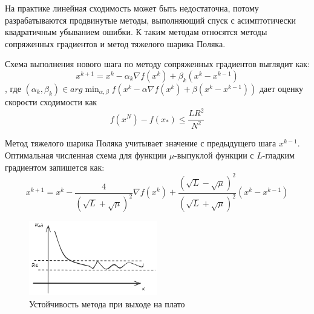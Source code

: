 На практике линейная сходимость может быть недостаточна, потому разрабатываются продвинутые методы, выполняющий спуск с
асимптотически квадратичным убыванием ошибки. К таким методам относятся методы сопряженных градиентов и 
метод тяжелого шарика Поляка.

Схема выполнения нового шага по методу сопряженных градиентов выглядит как:
\begin{equation}
    x^{k+1} = x^k - \alpha_k \nabla f(x^k) + \beta_k (x^k -x^{k-1})
\end{equation}
, где $(\alpha_k,\beta_k) \in arg \min_{\alpha,\beta} f(x^k - \alpha \nabla f(x^k) + \beta (x^k -x^{k-1}))$
дает оценку скорости сходимости как 
\begin{equation}
    f(x^N) -f(x_*) \le \frac{L R^2}{N^2}
\end{equation}

Метод тяжелого шарика Поляка учитывает значение с предыдущего шага $x^{k-1}$. Оптимальная численная схема
для функции $\mu$-выпуклой функции с $L$-гладким градиентом запишется как:
\begin{equation}
    x^{k+1} = x^k - \frac{4}{(\sqrt{L}+ \sqrt{\mu})^2} \nabla f(x^k) + \frac{(\sqrt{L} -\sqrt{\mu})^2}{(\sqrt{L} +\sqrt{\mu})^2} (x^k - x^{k-1})
\end{equation}

\begin{figure}[h]
    \centering
    \includegraphics[width=0.5\textwidth]{assets/math/optimization/stability.excalidraw.png}
    \caption{Устойчивость метода при выходе на плато}
    \label{optimization}
\end{figure}


